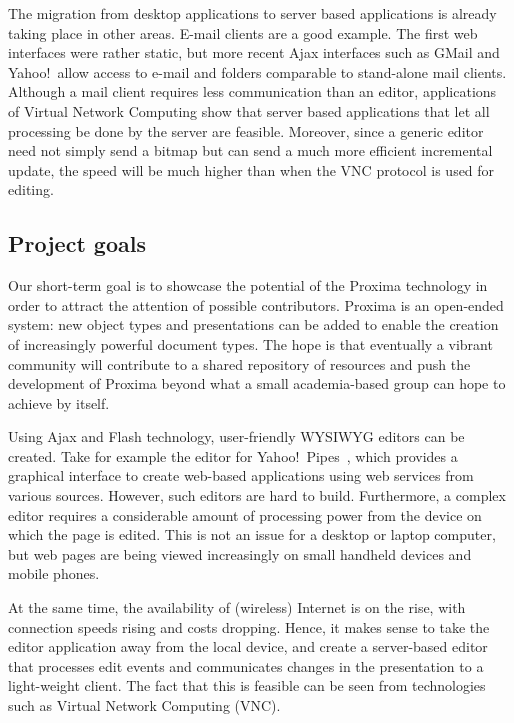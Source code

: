 \documentclass[10pt]{article}
\begin{document}

The migration from desktop applications to server based applications is already taking place in other areas. E-mail clients are a good example. The first web interfaces were rather static, but more recent Ajax interfaces such as GMail and Yahoo!\ allow access to e-mail and folders comparable to stand-alone mail clients. Although a mail client requires less communication than an editor, applications of Virtual Network Computing show that server based applications that let all processing be done by the server are feasible. Moreover, since a generic editor need not simply send a bitmap but can send a much more efficient incremental update, the speed will be much higher than when the VNC protocol is used for editing. 

\subsection{Project goals}

Our short-term goal is to showcase the potential of the Proxima technology in order to attract the attention of possible contributors. Proxima is an open-ended system: new object types and presentations can be added to enable the creation of increasingly powerful document types. The hope is that eventually a vibrant community will contribute to a shared repository of resources and push the development of Proxima beyond what a small academia-based group can hope to achieve by itself. 


\bc

Using Ajax and Flash technology, user-friendly WYSIWYG editors can be created. Take for example the editor for Yahoo!\ Pipes~\cite{yahoo08pipes}, which provides a graphical interface to create web-based applications using web services from various sources. However, such editors are hard to build. Furthermore, a complex editor requires a considerable amount of processing power from the device on which the page is edited. This is not an issue for a desktop or laptop computer, but web pages are being viewed increasingly on small handheld devices and mobile phones. 

At the same time, the availability of (wireless) Internet is on the rise, with connection speeds rising and costs dropping. Hence, it makes sense to take the editor application away from the local device, and create a server-based editor that processes edit events and communicates changes in the presentation to a light-weight client. The fact that this is feasible can be seen from technologies such as Virtual Network Computing (VNC).
\end{document}
